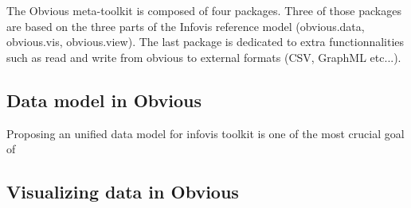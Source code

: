 The Obvious meta-toolkit is composed of four packages. Three of those packages
are based on the three parts of the Infovis reference model (obvious.data,
obvious.vis, obvious.view). The last package is dedicated to extra functionnalities
such as read and write from obvious to external formats (CSV, GraphML etc...).

\subsection{Data model in Obvious}

Proposing an unified data model for infovis toolkit is one of the most crucial goal
of 

\subsection{Visualizing data in Obvious}